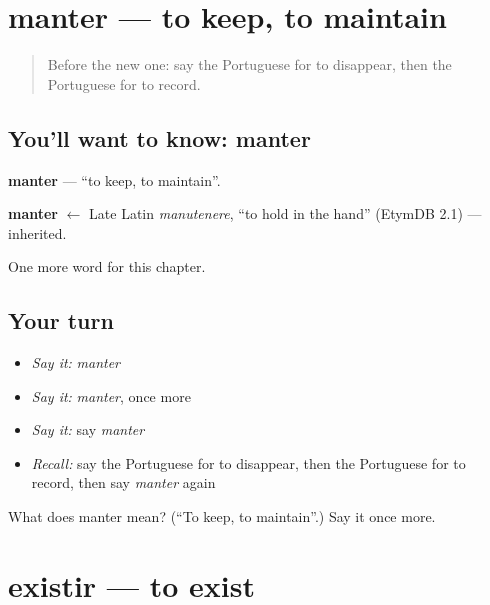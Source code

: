 \section[manter]{manter — to keep, to maintain}

\label{lesson:PT-C209-manter}



\begin{quote}
Before the new one: say the Portuguese for to disappear, then the Portuguese for to record.
\end{quote}

\subsection*{You'll want to know: manter}
\textbf{manter} — \textquotedblleft{}to keep, to maintain\textquotedblright{}.

\begin{cousinweb}
\textbf{manter} $\leftarrow$ Late Latin \emph{manutenere}, \textquotedblleft{}to hold in the hand\textquotedblright{} (EtymDB 2.1) — inherited.
\end{cousinweb}

\begin{grammarlens}[title={What you've built}]
One more word for this chapter.
\end{grammarlens}

\subsection*{Your turn}
\begin{itemize}
\raggedright
  \item \emph{Say it:} \emph{manter}
  \item \emph{Say it:} \emph{manter}, once more
  \item \emph{Say it:} say \emph{manter}
  \item \emph{Recall:} say the Portuguese for to disappear, then the Portuguese for to record, then say \emph{manter} again
\end{itemize}

\begin{tcolorbox}[breakable,colback=teal!4,colframe=teal!35!black,title={Before you move on}]
What does manter mean? (\textquotedblleft{}To keep, to maintain\textquotedblright{}.) Say it once more.
\end{tcolorbox}
\section[existir]{existir — to exist}

